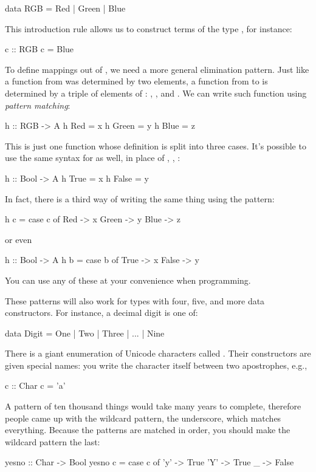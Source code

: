 \documentclass[DaoFP]{subfiles}
\begin{document}
\begin{haskell}
data RGB = Red | Green | Blue
\end{haskell}
This introduction rule allows us to construct terms of the type , for instance:
\begin{haskell}
c :: RGB
c = Blue
\end{haskell}
To define mappings out of , we need a more general elimination pattern. Just like a function from  was determined by two elements, a function from  to  is determined by a triple of elements of : , , and . We can write such function using \emph{pattern matching}:
\begin{haskell}
h :: RGB -> A
h Red   = x
h Green = y
h Blue  = z
\end{haskell}
This is just one function whose definition is split into three cases. It's possible to use the same syntax for  as well, in place of , , :
\begin{haskell}
h :: Bool -> A
h True  = x
h False = y
\end{haskell}
In fact, there is a third way of writing the same thing using the  pattern:
\begin{haskell}
h c = case c of
  Red   -> x
  Green -> y
  Blue  -> z
\end{haskell}
or even
\begin{haskell}
h :: Bool -> A
h b = case b of
  True  -> x
  False -> y
\end{haskell}
You can use any of these at your convenience when programming.

These patterns will also work for types with four, five, and more data constructors. For instance, a decimal digit is one of:
\begin{haskell}
data Digit = One | Two | Three | ... | Nine
\end{haskell}

There is a giant enumeration of Unicode characters called . Their constructors are given special names: you write the character itself between two apostrophes, e.g.,
\begin{haskell}
c :: Char
c = 'a'
\end{haskell}
A pattern of ten thousand things would take many years to complete, therefore people came up with the wildcard pattern, the underscore, which matches everything. Because the patterns are matched in order, you should make the wildcard pattern the last:
\begin{haskell}
yesno :: Char -> Bool
yesno c = case c of
  'y' -> True
  'Y' -> True
  _   -> False
\end{haskell}
\end{document}
